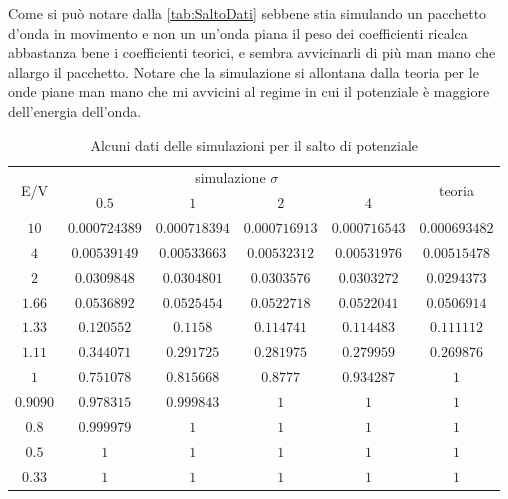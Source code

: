 Come si pu\`o notare dalla \autoref{tab:SaltoDati} sebbene stia simulando un pacchetto d'onda in movimento e non un un'onda piana il peso dei coefficienti ricalca abbastanza bene i coefficienti teorici, e sembra avvicinarli di pi\`u man mano che allargo il pacchetto. Notare che la simulazione si allontana dalla teoria per le onde piane man mano che mi avvicini al regime in cui il potenziale \`e maggiore dell'energia dell'onda.

\begin{table}[hbt]
	\centering
\begin{tabular}{cccccc}
\toprule
\multirow{2}{*}{E/V}&\multicolumn{4}{c}{simulazione $\sigma$}		& \multirow{2}{*}{teoria}		\\ \cmidrule(lr){2-5}
					&$0.5$			&$1$			&$2$			&$4$			&				\\ \midrule
$10$				&$0.000724389$	&$0.000718394$	&$0.000716913$	&$0.000716543$	&$0.000693482$	\\ \midrule
$4$					&$0.00539149$	&$0.00533663$	&$0.00532312$	&$0.00531976$	&$0.00515478$	\\ \midrule
$2$					&$0.0309848$	&$0.0304801$	&$0.0303576$	&$0.0303272$	&$0.0294373$	\\ \midrule
$1.66$				&$0.0536892$	&$0.0525454$	&$0.0522718$	&$0.0522041$	&$0.0506914$	\\ \midrule
$1.33$				&$0.120552$		&$0.1158$		&$0.114741$		&$0.114483$		&$0.111112$		\\ \midrule
$1.11$				&$0.344071$		&$0.291725$		&$0.281975$		&$0.279959$		&$0.269876$		\\ \midrule
$1$					&$0.751078$		&$0.815668$		&$0.8777$		&$0.934287$		&$1$			\\ \midrule
$0.9090$			&$0.978315$		&$0.999843$		&$1$			&$1$			&$1$			\\ \midrule
$0.8$				&$0.999979$		&$1$			&$1$			&$1$			&$1$			\\ \midrule
$0.5$				&$1$			&$1$			&$1$			&$1$			&$1$			\\ \midrule
$0.33$				&$1$			&$1$			&$1$			&$1$			&$1$			\\ \bottomrule
\end{tabular}
\caption{Alcuni dati delle simulazioni per il salto di potenziale}\label{tab:SaltoDati}
\end{table}

